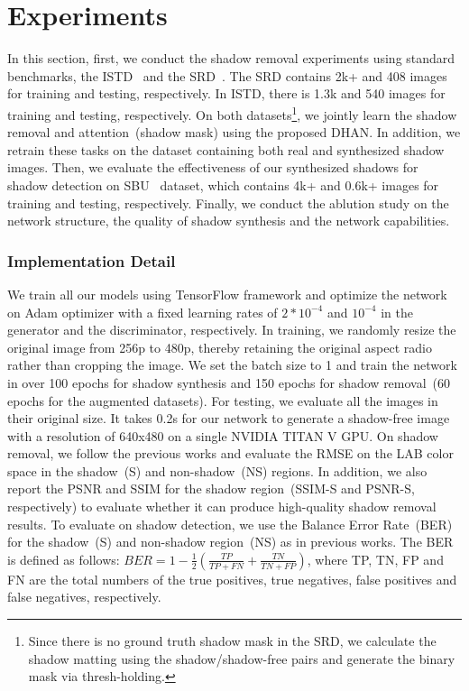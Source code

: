 \documentclass[letterpaper]{article} \usepackage{aaai20}  \usepackage{times}  \usepackage{helvet} \usepackage{courier}  \usepackage[hyphens]{url}  \urlstyle{rm} \def\UrlFont{\rm}  \usepackage{graphicx}  \frenchspacing  \setlength{\pdfpagewidth}{8.5in}  \setlength{\pdfpageheight}{11in}  \usepackage{amssymb}
\begin{document}
\section{Experiments}
In this section, first, we conduct the shadow removal experiments using  standard benchmarks, the ISTD~\cite{wang2018stacked} and the SRD~\cite{qu2017deshadownet}. The SRD contains 2k+ and 408 images for training and testing, respectively. In ISTD, there is 1.3k and 540 images  for training and testing, respectively. On both datasets\footnote{Since there is no ground truth shadow mask in the SRD, we calculate the shadow matting using the shadow/shadow-free pairs and generate the binary mask via thresh-holding.}, we jointly learn the shadow removal and attention~(shadow mask) using the proposed DHAN. In addition, we retrain these tasks on the dataset containing both real and synthesized shadow images. Then, we evaluate the effectiveness of our synthesized shadows for shadow detection on SBU~\cite{vicente2016large} dataset, which contains 4k+ and 0.6k+ images for training and testing, respectively. Finally, we conduct the ablution study on the network structure, the quality of shadow synthesis and the network capabilities. 
 

\subsubsection{Implementation Detail}
We train all our models using TensorFlow framework and optimize the network on Adam optimizer \cite{kingma2014adam} with a fixed learning rates of $2*10^{-4}$ and $10^{-4}$ in the generator and the discriminator, respectively. In training, we randomly resize the original image from 256p to 480p, thereby retaining the original aspect radio rather than cropping the image. We set the batch size to 1 and train the network in over 100 epochs for shadow synthesis and 150 epochs for shadow removal~(60 epochs for the augmented datasets). For testing, we evaluate all the images in their original size. It takes 0.2s for our network to generate a shadow-free image with a resolution of 640x480 on a single NVIDIA TITAN V GPU. On shadow removal, we follow the previous works and evaluate the RMSE on the LAB color space in the shadow~(S) and non-shadow~(NS) regions. In addition, we also report the PSNR and SSIM for the shadow region~(SSIM-S and PSNR-S, respectively) to evaluate whether it can produce high-quality shadow removal results. To evaluate on shadow detection, we use the Balance Error Rate~(BER) for the shadow~(S) and non-shadow region~(NS) as in previous works. The BER is defined as follows: $BER = 1 - \frac{1}{2}(\frac{TP}{TP+FN}+\frac{TN}{TN+FP})$, 
where TP, TN, FP and FN are the total numbers of the true positives, true negatives, false positives and false negatives, respectively.
\end{document}
